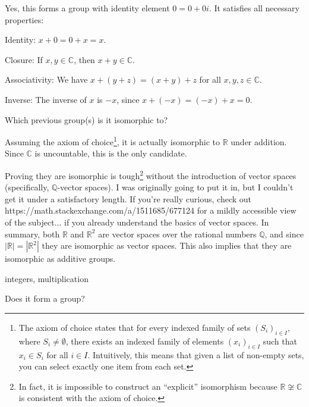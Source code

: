 \documentclass[../key.tex]{subfiles}
\begin{document}
\noindent Yes, this forms a group with identity element $0=0+0i$. It satisfies all necessary properties:

Identity: $x+0=0+x=x$.

Closure: If $x,y\in \mathbb{C}$, then $x+y\in \mathbb{C}$.

Associativity: We have $x+(y+z)=(x+y)+z$ for all $x,y,z \in \mathbb{C}$.

Inverse: The inverse of $x$ is $-x$, since $x+(-x)=(-x)+x=0$.

\begin{iinner_problem}
\item Which previous group(s) is it isomorphic to?
\end{iinner_problem}

\noindent Assuming the axiom of choice\footnote{The axiom of choice states that for every indexed family of sets $(S_i)_{i\in I}$, where $S_i\neq \emptyset$, there exists an indexed family of elements $(x_i)_{i\in I}$  such that $x_i\in S_i$ for all $i\in I$. Intuitively, this means that given a list of non-empty sets, you can select exactly one item from each set.}, it is actually isomorphic to $\mathbb{R}$ under addition. Since $\mathbb{C}$ is uncountable, this is the only candidate.

Proving they are isomorphic is tough\footnote{In fact, it is impossible to construct an ``explicit'' isomorphism because $\mathbb{R} \not \cong \mathbb{C}$ is consistent with the axiom of choice.} without the introduction of vector spaces (specifically, $\mathbb{Q}$-vector spaces). I was originally going to put it in, but I couldn't get it under a satisfactory length. If you're really curious, check out https://math.stackexchange.com/a/1511685/677124 for a mildly accessible view of the subject... if you already understand the basics of vector spaces. In summary, both $\mathbb{R}$ and $\mathbb{R}^2$ are vector spaces over the rational numbers $\mathbb{Q}$, and since $|\mathbb{R}|=|\mathbb{R}^2|$ they are isomorphic as vector spaces. This also implies that they are isomorphic as additive groups.

\begin{inner_problem}
\item integers, multiplication
\end{inner_problem}

\begin{iinner_problem}[start=1]
\item Does it form a group?
\end{iinner_problem}
\end{document}
